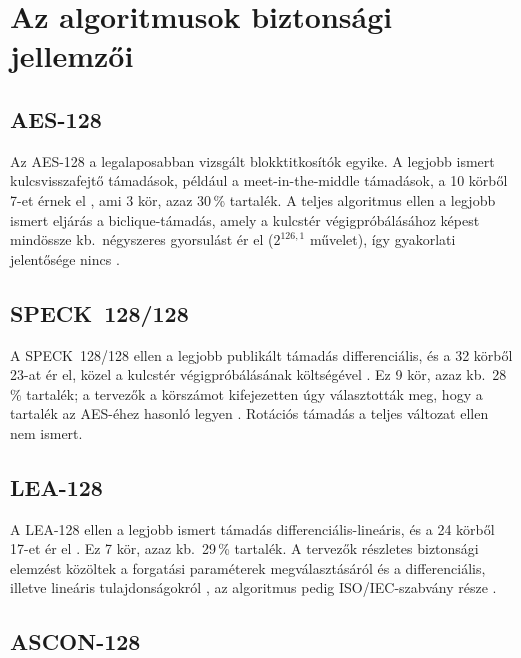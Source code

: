 \documentclass[a4paper,12pt]{report}
\theoremstyle{definition}
\theoremstyle{remark}
\begin{document}
\section{Az algoritmusok biztonsági jellemzői}\label{sec:alg_security}

\subsection{AES-128}

Az AES-128 a legalaposabban vizsgált blokktitkosítók egyike. A legjobb ismert kulcsvisszafejtő támadások, például a meet-in-the-middle támadások, a 10 körből 7-et érnek el \cite{Derbez2013}, ami 3 kör, azaz 30\,\% tartalék. A teljes algoritmus ellen a legjobb ismert eljárás a biclique-támadás, amely a kulcstér végigpróbálásához képest mindössze kb.\ négyszeres gyorsulást ér el ($2^{126{,}1}$ művelet), így gyakorlati jelentősége nincs \cite{Bogdanov2011}.

\subsection{SPECK~128/128}

A SPECK~128/128 ellen a legjobb publikált támadás differenciális, és a 32 körből 23-at ér el, közel a kulcstér végigpróbálásának költségével \cite{Song2016}. Ez 9 kör, azaz kb.\ 28\,\% tartalék; a tervezők a körszámot kifejezetten úgy választották meg, hogy a tartalék az AES-éhez hasonló legyen \cite{Beaulieu2017}. Rotációs támadás a teljes változat ellen nem ismert.

\subsection{LEA-128}

A LEA-128 ellen a legjobb ismert támadás differenciális-lineáris, és a 24 körből 17-et ér el \cite{Chen2023}. Ez 7 kör, azaz kb.\ 29\,\% tartalék. A tervezők részletes biztonsági elemzést közöltek a forgatási paraméterek megválasztásáról és a differenciális, illetve lineáris tulajdonságokról \cite{Hong2013}, az algoritmus pedig ISO/IEC-szabvány része \cite{ISO29192}.

\subsection{ASCON-128}
\end{document}
